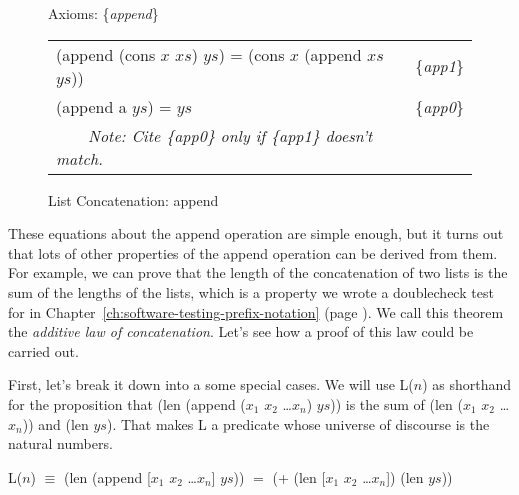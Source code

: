 \begin{figure}
\begin{center}
Axioms: \{\emph{append}\} \\
\begin{tabular}{ll}
(append (cons $x$ $xs$) $ys$) = (cons $x$ (append $xs$ $ys$)) & \{\emph{app1}\} \\
(append a   $ys$) =  $ys$                                     & \{\emph{app0}\} \\
~~~~\emph{Note: Cite \{\emph{app0}\} only if \{\emph{app1}\} doesn't match.}&\\
\end{tabular}
\end{center}
\caption{List Concatenation: append}
\label{append-equations}
\end{figure}

These equations about the append operation are simple enough,
but it turns out that lots of other properties of the
append operation can be derived from them.
For example, we can prove that the length of
the concatenation of two lists is the sum of the lengths of the lists,
which is a property we wrote a doublecheck test for in
Chapter~\ref{ch:software-testing-prefix-notation} (page \pageref{additive-lengths-test}).
We call this theorem the \emph{additive law of concatenation}.
Let's see how a proof of this law could be carried out.

First, let's break it down into a some special cases.
We will use L($n$) as shorthand for the proposition that
(len (append ($x_1$ $x_2$ \dots $x_n$) $ys$))
is the sum of (len ($x_1$ $x_2$ \dots $x_n$)) and (len $ys$).
That makes L a predicate whose universe of discourse is
the natural numbers.

\label{additive-concat-law-predicate}
\begin{center}
L($n$) $\equiv$ (len (append [$x_1$ $x_2$ \dots $x_n$] $ys$)) $=$ (+ (len [$x_1$ $x_2$ \dots $x_n$]) (len $ys$))
\end{center}

